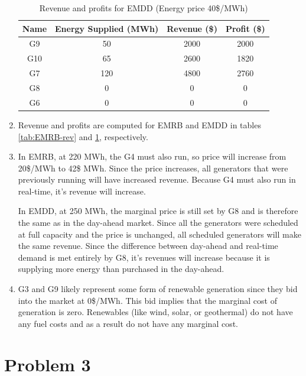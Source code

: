 \documentclass{homework}
\begin{document}
\begin{enumerate}
    \begin{table}
        \centering
        \begin{tabular}{|c|c|c|c|}
            \hline
            Name & Energy Supplied (MWh) &  Revenue (\$) & Profit (\$) \\
            \hline
            G9   &     50 &     2000  &         2000 \\
            G10  &     65 &     2600  &        1820 \\
            G7   &    120 &    4800  &        2760 \\
            G8   &     0  &     0  &        0 \\
            G6   &     0  &     0  &        0 \\
            \hline
        \end{tabular}
        \caption{Revenue and profits for EMDD (Energy price 40\$/MWh)}
        \label{tab:EMDD-rev}
    \end{table}
    
    \item Revenue and profits are computed for EMRB and EMDD in tables \ref{tab:EMRB-rev} and \ref{tab:EMDD-rev},
    respectively.

    \item In EMRB, at 220 MWh, the G4 must also run, so price will increase from 20\$/MWh to 42\$ MWh. Since
    the price increases, all generators that were previously running will have increased revenue. Because
    G4 must also run in real-time, it's revenue will increase.

    In EMDD, at 250 MWh, the marginal price is still set by G8 and is therefore the same as in the day-ahead
    market. Since all the generators were scheduled at full capacity and the price is unchanged, all scheduled
    generators will make the same revenue. Since the difference between day-ahead and real-time demand is 
    met entirely by G8, it's revenues will increase because it is supplying more energy than purchased 
    in the day-ahead.


    \item G3 and G9 likely represent some form of renewable generation since they bid into the market at 0\$/MWh.
    This bid implies that the marginal cost of generation is zero. Renewables (like wind, solar, or geothermal)
    do not have any fuel costs and as a result do not have any marginal cost.

\end{enumerate}

\section{Problem 3}
\end{document}
